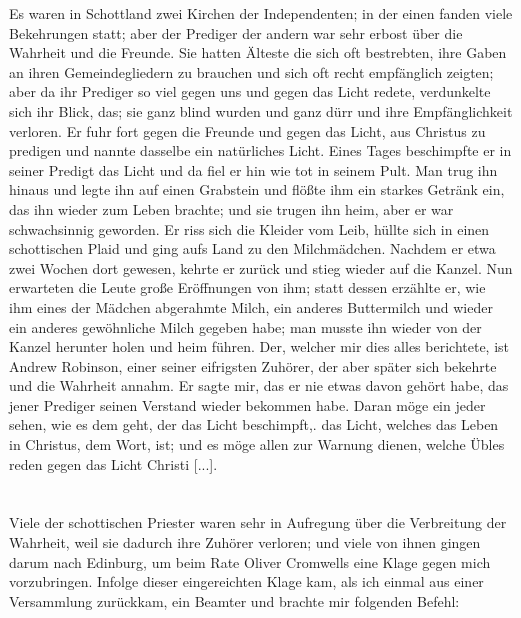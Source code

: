 Es waren in Schottland zwei Kirchen der 
Independenten;
in der einen fanden viele Bekehrungen statt; aber der 
Prediger der andern war sehr erbost über die Wahrheit und die
Freunde. Sie hatten Älteste die sich oft bestrebten, ihre Gaben
an ihren Gemeindegliedern zu brauchen und sich oft recht empfänglich
zeigten; aber da ihr Prediger so viel gegen uns und gegen das
Licht redete, verdunkelte sich ihr Blick, das; sie ganz blind wurden
und ganz dürr und ihre Empfänglichkeit verloren. Er fuhr fort
gegen die Freunde und gegen das Licht, aus Christus zu
predigen und nannte dasselbe ein natürliches Licht. Eines Tages
beschimpfte er in seiner Predigt das Licht und da fiel er hin wie
tot in seinem Pult. Man trug ihn hinaus und legte ihn auf
einen Grabstein und flößte ihm ein starkes Getränk ein, das ihn
wieder zum Leben brachte; und sie trugen ihn heim, aber er war
schwachsinnig geworden. Er riss sich die Kleider vom Leib, hüllte
sich in einen schottischen Plaid und ging aufs Land zu den
Milchmädchen. Nachdem er etwa zwei Wochen dort gewesen,
kehrte er zurück und stieg wieder auf die Kanzel. Nun erwarteten
die Leute große Eröffnungen von ihm; statt dessen erzählte er,
wie ihm eines der Mädchen abgerahmte Milch, ein anderes
Buttermilch und wieder ein anderes gewöhnliche Milch gegeben
habe; man musste ihn wieder von der Kanzel herunter holen und
heim führen. Der, welcher mir dies alles berichtete, ist Andrew
Robinson, einer seiner eifrigsten 
Zuhörer, der aber später sich
bekehrte und die Wahrheit annahm. Er sagte mir, das er nie
etwas davon gehört habe, das jener Prediger seinen Verstand
wieder bekommen habe. Daran möge ein jeder sehen, wie es
dem geht, der das Licht beschimpft,. das Licht, welches das Leben
in Christus, dem Wort, ist; und es möge allen zur Warnung
dienen, welche Übles reden gegen das Licht Christi [...].

\section{}

Viele der schottischen Priester waren sehr in Aufregung über
die Verbreitung der Wahrheit, weil sie dadurch ihre Zuhörer
verloren; und viele von ihnen gingen darum nach Edinburg,
um beim Rate Oliver Cromwells eine Klage gegen mich 
vorzubringen. Infolge dieser eingereichten Klage kam, als ich einmal
aus einer Versammlung zurückkam, ein Beamter und brachte mir
folgenden Befehl:

